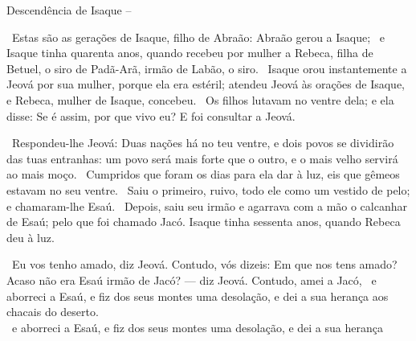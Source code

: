 \documentclass[12pt,aspectratio=169]{beamer}
\newcommand{\ver}[1]{%
    \raisebox{0.50ex}{%
        \scalebox{1.1}{%
            \pmb{\textbf{\textcolor{BSpbg}{#1}}}%
        }%
    }%
}
\newcommand{\QUOTE}[1]{%
    \par\noindent\hspace*{0.05\linewidth}%
    \begin{minipage}{0.9\linewidth}%
        \linespread{1.35}\large{#1}%
    \end{minipage}%
}
\newcommand{\ORA}[1]{{\textcolor{TXred!50!TXyel}{#1}}}
\newcommand{\YEL}[1]{{\textcolor{TXyel}{#1}}}
\begin{document}
    \begin{frame}[allowframebreaks]{Descendência de \YEL{Isaque} --}
        \QUOTE{%
            \ver{Gn 25.19}~Estas são as gerações de Isaque, filho de Abraão: \YEL{Abraão} gerou
            a \YEL{Isaque};
            \ver{20}~e Isaque tinha quarenta anos, quando recebeu por mulher a Rebeca, filha de
            Betuel, o siro de Padã-Arã, irmão de Labão, o siro.
            \ver{21}~Isaque orou instantemente a Jeová por sua mulher, porque ela era estéril;
            atendeu Jeová às orações de Isaque, e Rebeca, mulher de Isaque, concebeu.
            \ver{22}~Os filhos lutavam no ventre dela; e ela disse: Se é assim, por que vivo eu?
            E foi consultar a Jeová.
        }

        \pagebreak

        \QUOTE{%
            \ver{23}~Respondeu-lhe Jeová: \ORA{Duas} \YEL{nações} há no teu ventre, e dois povos
            se \ORA{dividirão} das tuas entranhas: um povo será mais forte que o outro, e \YEL{o
            mais velho servirá ao mais moço}.
            \ver{24}~Cumpridos que foram os dias para ela dar à luz, eis que gêmeos estavam no
            seu ventre.
            \ver{25}~Saiu o primeiro, ruivo, todo ele como um vestido de pelo; e chamaram-lhe
            \ORA{Esaú}.
            \ver{26}~Depois, saiu seu irmão e agarrava com a mão o calcanhar de Esaú; pelo que
            foi chamado \YEL{Jacó}. Isaque tinha sessenta anos, quando Rebeca deu à luz.
        }

        \pagebreak

        \QUOTE{%
            \ver{Ml 1.2}~Eu vos tenho amado, diz Jeová. Contudo, vós dizeis: Em que nos tens
            amado? Acaso não era Esaú irmão de Jacó? — diz Jeová. Contudo, amei a Jacó,
            \ver{3}~e aborreci a Esaú, e fiz dos seus montes uma desolação, e dei a sua herança
            aos chacais do deserto.
            \\
            \ver{Rm 9}~e aborreci a Esaú, e fiz dos seus montes uma desolação, e dei a sua herança
        }
    \end{frame}

\end{document}
